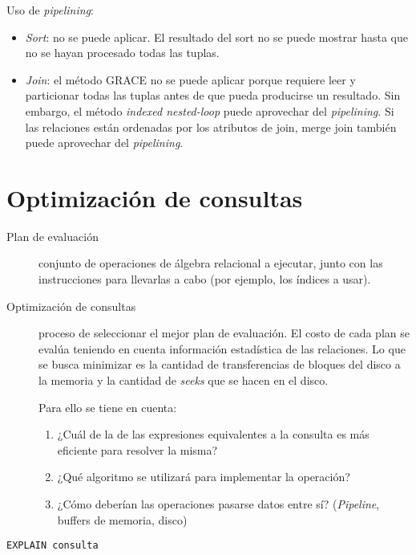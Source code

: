 \documentclass[a4paper, twoside]{article}
\begin{document}
Uso de \emph{pipelining}:
\begin{itemize}
	\item \emph{Sort}: no se puede aplicar. El resultado del sort no se puede mostrar hasta que no se hayan procesado todas las tuplas.
	\item \emph{Join}: el método GRACE no se puede aplicar porque requiere leer y particionar todas las tuplas antes de que pueda producirse un resultado. Sin embargo, el método \emph{indexed nested-loop} puede aprovechar del \emph{pipelining}. Si las relaciones están ordenadas por los atributos de join, merge join también puede aprovechar del \emph{pipelining}.
\end{itemize}

\section{Optimización de consultas}
\begin{description}
	\item[Plan de evaluación] conjunto de operaciones de álgebra relacional a ejecutar, junto con las instrucciones para llevarlas a cabo (por ejemplo, los índices a usar).
	\item[Optimización de consultas] proceso de seleccionar el mejor plan de evaluación. El costo de cada plan se evalúa teniendo en cuenta información estadística de las relaciones. Lo que se busca minimizar es la cantidad de transferencias de bloques del disco a la memoria y la cantidad de \emph{seeks} que se hacen en el disco. 

	Para ello se tiene en cuenta:
	\begin{enumerate}
		\item ¿Cuál de la de las expresiones equivalentes a la consulta es más eficiente para resolver la misma?
		\item ¿Qué algoritmo se utilizará para implementar la operación?
		\item ¿Cómo deberían las operaciones pasarse datos entre sí? (\emph{Pipeline}, buffers de memoria, disco)
	\end{enumerate}
\end{description}

\begin{lstlisting}
EXPLAIN consulta
\end{lstlisting}
 
\end{document}
